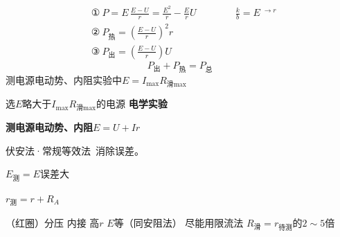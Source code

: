
\begin{align*}
&\text{①}\ P=E\,\frac{E-U}{r}=\frac{E^2}{r}-\frac{E}{r}U\qquad\qquad \frac{k}{b}=E\ {}^{\to r}\\
&\text{②}\ P_{\text{热}}=\left(\frac{E-U}{r}\right)^{2}r\\
&\text{③}\ P_{\text{出}}=\left(\frac{E-U}{r}\right)U
\end{align*}
\[
P_{\text{出}}+P_{\text{热}}=P_{\text{总}}
\]
测电源电动势、内阻实验中\qquad $E=I_{\max}R_{\text{滑}\max}$

选$E$略大于$I_{\max}R_{\text{滑}\max}$的电源
\textbf{电学实验}

\textbf{测电源电动势、内阻}\qquad $E=U+Ir$

伏安法·常规\qquad 等效法\ 消除误差。

\begin{minipage}[t]{0.50\linewidth}
\end{minipage}\hfill
\begin{minipage}[t]{0.46\linewidth}
\end{minipage}

$E_{\text{测}}=E$\qquad 误差大 

$r_{\text{测}}=r+R_A$

（红圈）分压 内接 高$r$ $E$等（同安阻法）
尽能用限流法 %
\quad $R_{\text{滑}}=r_{\text{待测}}$的$2\sim5$倍

\begin{minipage}[t]{0.50\linewidth}
\end{minipage}\hfill
\begin{minipage}[t]{0.46\linewidth}
\end{minipage}

